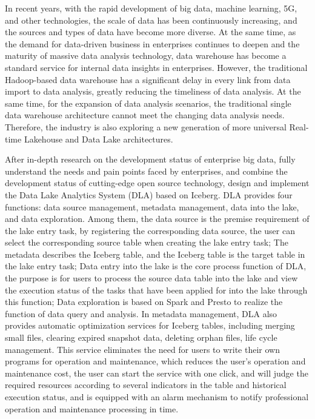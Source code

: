 \begin{abstract*}

In recent years, with the rapid development of big data, machine learning,
5G, and other technologies, the scale of data has been continuously
increasing, and the sources and types of data have become more diverse.
At the same time, as the demand for data-driven business in enterprises
continues to deepen and the maturity of massive data analysis technology,
data warehouse has become a standard service for internal data insights in
enterprises. However, the traditional Hadoop-based data warehouse has a
significant delay in every link from data import to data analysis, greatly
reducing the timeliness of data analysis. At the same time, for the expansion
of data analysis scenarios, the traditional single data warehouse architecture
cannot meet the changing data analysis needs. Therefore, the industry is also
exploring a new generation of more universal Real-time Lakehouse and Data Lake architectures.

After in-depth research on the development status of enterprise big data,
fully understand the needs and pain points faced by enterprises, and combine
the development status of cutting-edge open source technology, design and
implement the Data Lake Analytics System (DLA)
based on Iceberg. DLA provides four functions: data source management,
metadata management, data into the lake, and data exploration. Among them,
the data source is the premise requirement of the lake entry task,
by registering the corresponding data source, the user can select the
corresponding source table when creating the lake entry task; The metadata
describes the Iceberg table, and the Iceberg table is the target table in the
lake entry task; Data entry into the lake is the core process function of DLA,
the purpose is for users to process the source data table into the lake and view
the execution status of the tasks that have been applied for into the lake through
this function; Data exploration is based on Spark and Presto to realize the function
of data query and analysis. In metadata management, DLA also provides automatic
optimization services for Iceberg tables, including merging small files, clearing
expired snapshot data, deleting orphan files, life cycle management. This
service eliminates the need for users to write their own programs for operation
and maintenance, which reduces the user's operation and maintenance cost, the
user can start the service with one click, and will judge the required resources
according to several indicators in the table and historical execution status,
and is equipped with an alarm mechanism to notify professional operation and maintenance processing in time.


\end{abstract*}
